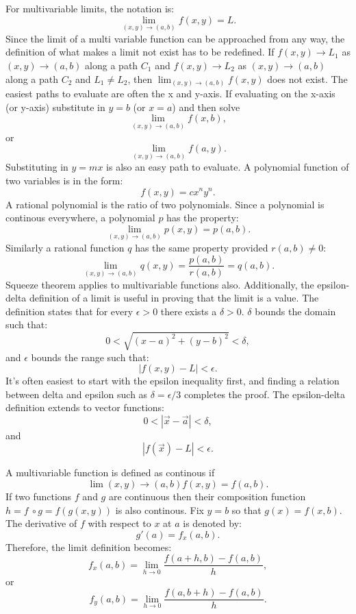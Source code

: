 \documentclass{article}
\begin{document}
For multivariable limits, the notation is:
\[\lim_{(x,y)\to (a,b)}f(x,y) = L.\]
Since the limit of a multi variable function can be approached from any way,
the definition of what makes a limit not exist has to be redefined. If 
$f(x,y) \to L_1$ as $(x,y) \to (a,b)$ along a path $C_1$ and $f(x,y) \to L_2$ as
$(x,y) \to (a,b)$ along a path $C_2$ and $L_1 \neq L_2$, then $\lim_{(x,y)\to (a,b)}f(x,y)$
does not exist. The easiest paths to evaluate are often the x and y-axis. 
If evaluating on the x-axis (or y-axis) substitute in $y=b$ (or $x=a$) and then solve
\[\lim_{(x,y) \to (a, b)} f(x,b),\] or \[\lim_{(x,y) \to (a, b)} f(a,y).\] 
Substituting in $y = mx$ is also an easy path to evaluate. A polynomial function of two variables
is in the form: \[f(x,y) = cx^n y^n.\] A rational polynomial is the ratio of two polynomials.
Since a polynomial is continous everywhere, a polynomial $p$ has the property:
\[\lim_{(x,y) \to (a,b)} p(x,y) = p(a,b).\]
Similarly a rational function $q$ has the same property provided $r(a,b) \neq 0$:
\[\lim_{(x,y) \to (a,b)} q(x,y) = \frac{p(a,b)}{r(a,b)} = q(a,b).\]
Squeeze theorem applies to multivariable functions also. Additionally,
the epsilon-delta definition of a limit is useful in proving that the limit is a value.
The definition states that for every $\epsilon > 0$ there exists a $\delta > 0$. 
$\delta$ bounds the domain such that:
\[0 < \sqrt{(x-a)^2 + (y-b)^2} < \delta,\]
and $\epsilon$ bounds the range such that: \[|f(x,y) - L| < \epsilon.\]
It's often easiest to start with the epsilon inequality first,
and finding a relation between delta and epsilon such as $\delta = \epsilon/3$
completes the proof. The epsilon-delta definition extends to vector functions:
\[0 < |\vec{x} - \vec{a}| < \delta, \] and
\[|f(\vec{x}) - L| < \epsilon.\]

A multivariable function is defined as continous if
\[\lim{(x,y) \to (a,b) f(x,y) = f(a,b)}.\] 
If two functions $f$ and $g$ are continuous then their composition function
$h = f \: \circ g = f(g(x,y))$ is also continous. Fix $y=b$ so that $g(x)=f(x,b)$.
The derivative of $f$ with respect to $x$ at $a$ is denoted by:
\[g'(a) = f_x(a,b).\] Therefore, the limit definition becomes:
\[f_x(a,b) = \lim_{h \to 0}\frac{f(a+h,b) - f(a,b)}{h},\]
or \[f_y(a,b) = \lim_{h \to 0}\frac{f(a,b+h) - f(a,b)}{h}.\]
\end{document}
